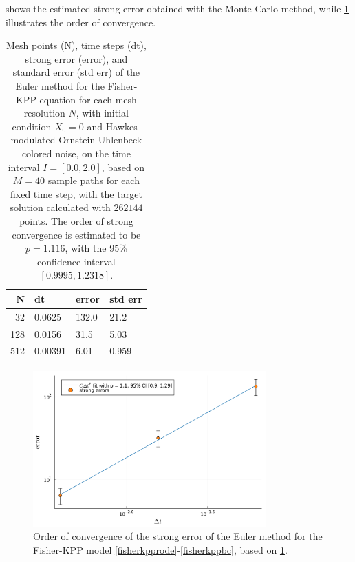 \documentclass[reqno,12pt]{amsart}
\theoremstyle{plain} %
\theoremstyle{definition} %
\begin{document}
 shows the estimated strong error obtained with the Monte-Carlo method, while \cref{figfisherkpp} illustrates the order of convergence.

\begin{table}
    \begin{center}
        \begin{tabular}[htb]{|r|l|l|l|}
            \hline N & dt & error & std err \\
            \hline \hline
            32 & 0.0625 & 132.0 & 21.2 \\
            128 & 0.0156 & 31.5 & 5.03 \\
            512 & 0.00391 & 6.01 & 0.959 \\
            \hline
        \end{tabular}
    \end{center}

    \bigskip

    \caption{Mesh points (N), time steps (dt), strong error (error), and standard error (std err) of the Euler method for the Fisher-KPP equation for each mesh resolution $N$, with initial condition $X_0 = 0$ and Hawkes-modulated Ornstein-Uhlenbeck colored noise, on the time interval $I = [0.0, 2.0]$, based on $M = 40$ sample paths for each fixed time step, with the target solution calculated with $262144$ points. The order of strong convergence is estimated to be $p = 1.116$, with the 95\% confidence interval $[0.9995, 1.2318]$.}

    \label{tablefisherkpp}
\end{table}

\begin{figure}[htb]
    \centerline{\includegraphics[width=0.8\textwidth]{img/order_fisherkpp.pdf}}
    \caption{Order of convergence of the strong error of the Euler method for the Fisher-KPP model \cref{fisherkpprode}-\cref{fisherkppbc}, based on \cref{tablefisherkpp}.}
    \label{figfisherkpp}
\end{figure}



\end{document}
